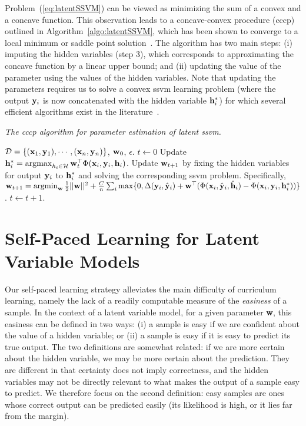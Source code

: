 \documentclass{article}
\newcommand{\mysection}[1]{\vspace{-4mm}\section{#1}\vspace{-4mm}}
\newcommand{\mytopcaption}[1]{\caption{\em \footnotesize #1}}
\newcommand{\argmin}{\operatornamewithlimits{argmin}}
\newcommand{\argmax}{\operatornamewithlimits{argmax}}
\begin{document}
Problem~(\ref{eq:latentSSVM}) can be viewed as minimizing the sum
of a convex and a concave function. This observation leads to a
concave-convex procedure ({\sc cccp})~\cite{yuillenc03} outlined in
Algorithm~\ref{algo:latentSSVM}, which has been shown to converge to a
local minimum or saddle point solution~\cite{sriperumbudurnips09}.
The algorithm has two main steps: (i) imputing the hidden variables
(step 3), which corresponds to approximating the concave function by a
linear upper bound; and (ii) updating the value of the parameter using
the values of the hidden variables.  Note that updating the parameters
requires us to solve a convex {\sc ssvm} learning problem (where the output
${\bf y}_i$ is now concatenated with the hidden variable ${\bf h}_i^*$) for
which several efficient algorithms exist
in the literature~\cite{joachimsml09,taskarnips03,tsochantaridisicml04}.

\begin{algorithm}[h!]
\mytopcaption{The {\sc cccp} algorithm for parameter estimation of latent {\sc ssvm}.}
\label{algo:latentSSVM}
\begin{algorithmic}[1]
\INPUT ${\cal D} = \{({\bf x}_1,{\bf y}_1),\cdots,({\bf x}_n,{\bf y}_n)\}$, ${\bf w}_0$, $\epsilon$.
\STATE $t \leftarrow 0$
\REPEAT
\STATE Update ${\bf h}_i^* = \argmax_{h_i \in {\cal H}} {\bf w}_{t}^\top \Phi({\bf x}_i,{\bf y}_i,{\bf h}_i)$.
\STATE Update ${\bf w}_{t+1}$ by fixing the hidden variables for output ${\bf y}_i$ to ${\bf h}_i^*$ and solving the corresponding
{\sc ssvm} problem. Specifically, \\
${\bf w}_{t+1} = \argmin_{\bf w} \frac{1}{2}||{\bf w}||^2 + \frac{C}{n}\sum_i \max\{0,\Delta({\bf y}_i,\hat{\bf y}_i) +
		{\bf w}^\top (\Phi({\bf x}_i,\hat{\bf y}_i,\hat{\bf h}_i) - \Phi({\bf x}_i,{\bf y}_i,{\bf h}_i^*))\}$.
\STATE $t \leftarrow t + 1$.
\end{algorithmic}
\end{algorithm}

\mysection{Self-Paced Learning for Latent Variable Models}
\label{sec:selfPacedLVM}
Our self-paced learning strategy alleviates the
main difficulty of curriculum learning, namely the lack of a readily
computable measure of the {\em easiness} of a sample. In the context
of a latent variable model, for a given parameter {\bf w}, this easiness
can be defined in two ways: (i) a
sample is easy if we are confident about the value of a hidden
variable; or (ii) a sample is easy if it is easy to predict
its true output. The two
definitions are somewhat related: if we are more certain about the
hidden variable, we may be more certain about the prediction. They are
different in that certainty does not imply correctness, and the hidden
variables may not be directly relevant to what makes the output of
a sample easy to predict. 
We therefore focus on the second definition: easy samples are ones
whose correct output can be predicted easily (its likelihood is
high, or it lies far from the margin).
\end{document}
